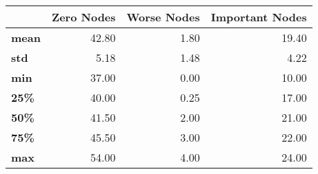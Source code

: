 \begin{tabular}{lrrr}
\toprule
{} &  Zero Nodes &  Worse Nodes &  Important Nodes \\
\midrule
\textbf{mean} &       42.80 &         1.80 &            19.40 \\
\textbf{std } &        5.18 &         1.48 &             4.22 \\
\textbf{min } &       37.00 &         0.00 &            10.00 \\
\textbf{25\% } &       40.00 &         0.25 &            17.00 \\
\textbf{50\% } &       41.50 &         2.00 &            21.00 \\
\textbf{75\% } &       45.50 &         3.00 &            22.00 \\
\textbf{max } &       54.00 &         4.00 &            24.00 \\
\bottomrule
\end{tabular}
